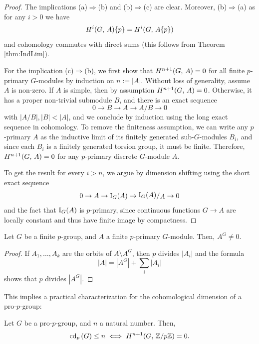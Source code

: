 \documentclass[a4paper, oneside]{memoir}
\begin{document}
\begin{proof}
	The implications (a)$\Rightarrow$(b) and (b)$\Rightarrow$(c) are clear. Moreover, (b)$\Rightarrow$(a) as for any $i>0$ we have
	\[
		H^{i}( G, \, A )\{p\}=H^{i}( G, \, A\{p\} )
	\]
	and cohomology commutes with direct sums (this follows from Theorem \ref{thm:IndLim}).

	\noindent For the implication (c)$\Rightarrow$(b), we first show that $H^{n+1}( G, \, A )=0$ for all finite $p$-primary $G$-modules by induction on $n:=|A|$. Without loss of generality, assume $A$ is non-zero. If $A$ is simple, then by assumption $H^{n+1}( G, \, A )=0$. Otherwise, it has a proper non-trivial submodule $B$, and there is an exact sequence
	\[
		0\to B\to A\to A/B\to 0
	\]
	with $|A/B|,|B|<|A|$, and we conclude by induction using the long exact sequence in cohomology. To remove the finiteness assumption, we can write any $p$-primary $A$ as the inductive limit of its finitely generated sub-$G$-modules $B_i$, and since each $B_i$ is a finitely generated torsion group, it must be finite. Therefore, $H^{n+1}( G, \, A )=0$ for any $p$-primary discrete $G$-module $A$.

	To get the result for every $i>n$, we argue by dimension shifting using the short exact sequence
	\[
		0\to A \to \Ind{G}{A} \to \ssfrac{\Ind{G}{A}}{A} \to 0
	\]
	and the fact that $\operatorname{I}_{G}(A)$ is $p$-primary, since continuous functions $G\to A$ are locally constant and thus have finite image by compactness.
\end{proof}

\begin{lemma}\label{lm:Inv}
	Let $G$ be a finite $p$-group, and $A$ a finite $p$-primary $G$-module. Then, $A^G\neq 0$.
\end{lemma}

\begin{proof}
	If $A_1,\ldots,A_k$ are the orbits of $A\setminus A^G$, then $p$ divides $|A_i|$ and the formula
	\[
		|A|=|A^G|+\sum_i{|A_i|}
	\]
	shows that $p$ divides $|A^G|$.
\end{proof}

This implies a practical characterization for the cohomological dimension of a pro-$p$-group:

\begin{theorem}\label{thm:CdProP}
	Let $G$ be a pro-$p$-group, and $n$ a natural number. Then,
	\[
		\operatorname{cd}_p{(G)}\leq n \iff H^{n+1}( G, \, \mathbb{Z}/{p\mathbb{Z}} )=0
		.\]
\end{theorem}
\end{document}
